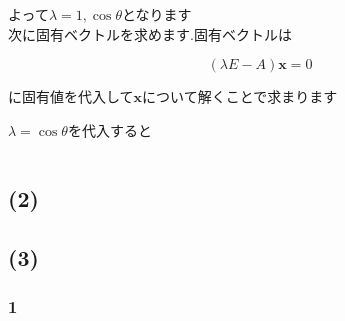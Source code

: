 \documentclass{article}
\begin{document}
よって$\lambda = 1, \cos \theta$となります\\

次に固有ベクトルを求めます.固有ベクトルは

$$
(\lambda E - A)\bm{x} = 0
$$

に固有値を代入して$\bm{x}$について解くことで求まります

$\lambda = \cos \theta$を代入すると

$$

$$

\subsection*{(2)}
\subsection*{(3)}
\subsubsection*{1}
\end{document}
